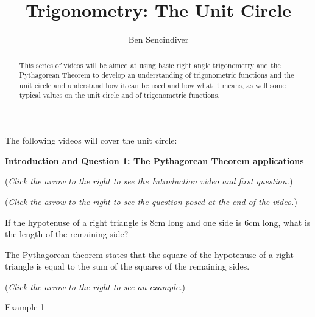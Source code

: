 \documentclass{ximera}
\title[Prerequisite Videos: ]{Trigonometry: The Unit Circle}
\author{Ben Sencindiver}
\begin{document}
\begin{abstract}
  This series of videos will be aimed at using basic right angle trigonometry
  and the Pythagorean Theorem to develop an understanding of trigonometric
  functions and the unit circle and understand how it can be used and
  how what it means, as well some typical values on the unit circle
  and of trigonometric functions.
\end{abstract}
\maketitle

The following videos will cover the unit circle:

\textbf{Introduction and Question 1: The Pythagorean Theorem applications}
\begin{question}
\begin{flushright}
{\color{blue}(\emph{Click the arrow to the right to see the Introduction video and first question.})}
\end{flushright}
\begin{center}
\begin{expandable}
{\color{blue}(\emph{Click the arrow to the right to see the question
posed at the end of the video.})}
\begin{expandable}
If the hypotenuse of a right triangle is $8$cm long and one side is
$6$cm long, what is the length of the remaining side?
\begin{multipleChoice}
\end{multipleChoice}
\begin{hint}
The Pythagorean theorem states that the square of the hypotenuse
of a right triangle is equal to the sum of the squares of the remaining
sides.
\end{hint}
\begin{flushright}
{\color{blue}(\emph{Click the arrow to the right to see an example.})}
\end{flushright}
\begin{expandable}
Example 1
\end{expandable}
\end{expandable}
\end{expandable}
\end{center}
\end{question}
\end{document}
